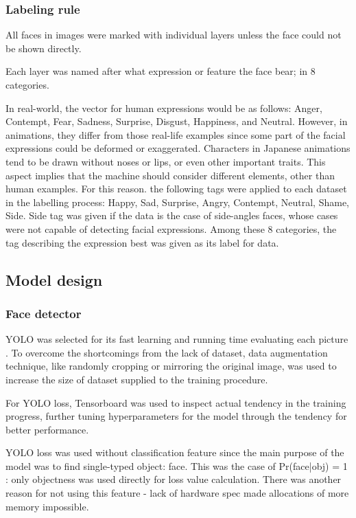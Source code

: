 \documentclass{article}
\begin{document}
\subsubsection{Labeling rule}
All faces in images were marked with individual layers unless the face could not
be shown directly.

Each layer was named after what expression or feature the face bear; in 8
categories.

In real-world, the vector for human expressions would be as follows: Anger,
Contempt, Fear, Sadness, Surprise, Disgust, Happiness, and Neutral. However, in
animations, they differ from those real-life examples since some part of the
facial expressions could be deformed or exaggerated. Characters in Japanese
animations tend to be drawn without noses or lips, or even other important
traits. This aspect implies that the machine should consider different elements,
other than human examples. For this reason. the following tags were applied to
each dataset in the labelling process: Happy, Sad, Surprise, Angry, Contempt,
Neutral, Shame, Side. Side tag was given if the data is the case of side-angles
faces, whose cases were not capable of detecting facial expressions. Among these
8 categories, the tag describing the expression best was given as its label for
data.

\subsection{Model design}
\subsubsection{Face detector}
YOLO was selected for its fast learning and running time evaluating each picture
\cite{redmon2018yolov3}. To overcome the shortcomings from the lack of dataset,
data augmentation technique, like randomly cropping or mirroring the original
image, was used to increase the size of dataset supplied to the training
procedure.

For YOLO loss, Tensorboard was used to inspect actual tendency in the training
progress, further tuning hyperparameters for the model through the tendency for
better performance.


YOLO loss was used without classification feature since the main purpose of the
model was to find single-typed object: face. This was the case of Pr(face|obj) =
1 : only objectness was used directly for loss value calculation. There was
another reason for not using this feature - lack of hardware spec made
allocations of more memory impossible.
\end{document}
